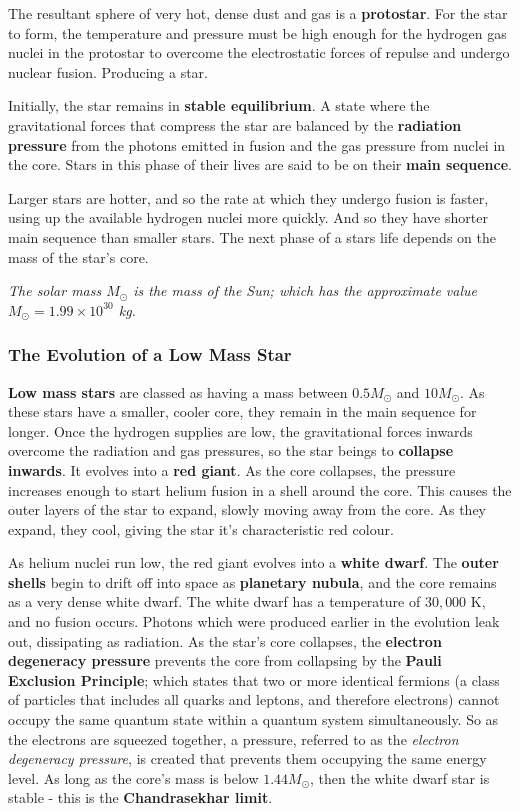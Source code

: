 The resultant sphere of very hot, dense dust and gas is a \textbf{protostar}.  For the star to form, the temperature and pressure must be high enough for the hydrogen gas nuclei in the protostar to overcome the electrostatic forces of repulse and undergo nuclear fusion. Producing a star.

Initially, the star remains in \textbf{stable equilibrium}. A state where the gravitational forces that compress the star are balanced by the \textbf{radiation pressure} from the photons emitted in fusion and the gas pressure from nuclei in the core. Stars in this phase of their lives are said to be on their \textbf{main sequence}.

Larger stars are hotter, and so the rate at which they undergo fusion is faster, using up the available hydrogen nuclei more quickly. And so they have shorter main sequence than smaller stars. The next phase of a stars life depends on the mass of the star's core. 

\begin{notation}
\textit{The solar mass $M_{\odot}$ is the mass of the Sun; which has the approximate value {$M_{\odot} = 1.99 \times 10^{30}$ kg.}}
\end{notation}

\subsubsection*{The Evolution of a Low Mass Star}

\textbf{Low mass stars} are classed as having a mass between $0.5 M_{\odot}$ and $10 M_{\odot}$. As these stars have a smaller, cooler core, they remain in the main sequence for longer. Once the hydrogen supplies are low, the gravitational forces inwards overcome the radiation and gas pressures, so the star beings to \textbf{collapse inwards}. It evolves into a \textbf{red giant}. As the core collapses, the pressure increases enough to start helium fusion in a shell around the core. This causes the outer layers of the star to expand, slowly moving away from the core. As they expand, they cool, giving the star it's characteristic red colour. 

As helium nuclei run low, the red giant evolves into a \textbf{white dwarf}. The \textbf{outer shells} begin to drift off into space as \textbf{planetary nubula}, and the core remains as a very dense white dwarf. The white dwarf has a temperature of $30,000$ K, and no fusion occurs. Photons which were produced earlier in the evolution leak out, dissipating as radiation. As the star's core collapses, the \textbf{electron degeneracy pressure} prevents the core from collapsing by the \textbf{Pauli Exclusion Principle}; which states that two or more identical fermions (a class of particles that includes all quarks and leptons, and therefore electrons) cannot occupy the same quantum state within a quantum system simultaneously. So as the electrons are squeezed together, a pressure, referred to as the \textit{electron degeneracy pressure}, is created that prevents them occupying the same energy level. As long as the core's mass is below $1.44M_{\odot}$, then the white dwarf star is stable - this is the \textbf{Chandrasekhar limit}.

